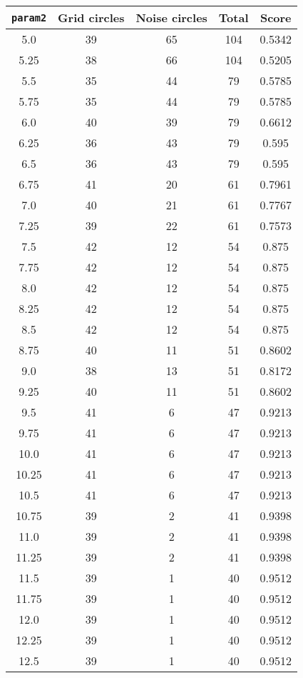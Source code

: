 \documentclass[letterpaper, 12pt]{article}
\begin{document}
\begin{longtable}{|c|c|c|c|c|}
\hline
\textbf{\texttt{param2}} & \textbf{Grid circles} & \textbf{Noise circles} & \textbf{Total} & \textbf{Score} \\
\hline
5.0 & 39 & 65 & 104 & 0.5342 \\
\hline
5.25 & 38 & 66 & 104 & 0.5205 \\
\hline
5.5 & 35 & 44 & 79 & 0.5785 \\
\hline
5.75 & 35 & 44 & 79 & 0.5785 \\
\hline
6.0 & 40 & 39 & 79 & 0.6612 \\
\hline
6.25 & 36 & 43 & 79 & 0.595 \\
\hline
6.5 & 36 & 43 & 79 & 0.595 \\
\hline
6.75 & 41 & 20 & 61 & 0.7961 \\
\hline
7.0 & 40 & 21 & 61 & 0.7767 \\
\hline
7.25 & 39 & 22 & 61 & 0.7573 \\
\hline
7.5 & 42 & 12 & 54 & 0.875 \\
\hline
7.75 & 42 & 12 & 54 & 0.875 \\
\hline
8.0 & 42 & 12 & 54 & 0.875 \\
\hline
8.25 & 42 & 12 & 54 & 0.875 \\
\hline
8.5 & 42 & 12 & 54 & 0.875 \\
\hline
8.75 & 40 & 11 & 51 & 0.8602 \\
\hline
9.0 & 38 & 13 & 51 & 0.8172 \\
\hline
9.25 & 40 & 11 & 51 & 0.8602 \\
\hline
9.5 & 41 & 6 & 47 & 0.9213 \\
\hline
9.75 & 41 & 6 & 47 & 0.9213 \\
\hline
10.0 & 41 & 6 & 47 & 0.9213 \\
\hline
10.25 & 41 & 6 & 47 & 0.9213 \\
\hline
10.5 & 41 & 6 & 47 & 0.9213 \\
\hline
10.75 & 39 & 2 & 41 & 0.9398 \\
\hline
11.0 & 39 & 2 & 41 & 0.9398 \\
\hline
11.25 & 39 & 2 & 41 & 0.9398 \\
\hline
11.5 & 39 & 1 & 40 & 0.9512 \\
\hline
11.75 & 39 & 1 & 40 & 0.9512 \\
\hline
12.0 & 39 & 1 & 40 & 0.9512 \\
\hline
12.25 & 39 & 1 & 40 & 0.9512 \\
\hline
12.5 & 39 & 1 & 40 & 0.9512 \\

\end{longtable}
\end{document}
